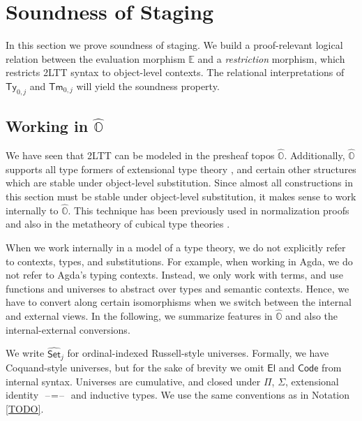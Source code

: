 \documentclass[acmsmall]{acmart}
\newcommand{\msf}[1]{\mathsf{#1}}
\newcommand{\mbb}[1]{\mathbb{#1}}
\newcommand{\wh}[1]{\widehat{#1}}
\newcommand{\Code}{\msf{Code}}
\newcommand{\El}{\msf{El}}
\newcommand{\mbbo}{\mbb{O}}
\newcommand{\Ty}{\msf{Ty}}
\newcommand{\Tm}{\msf{Tm}}
\newcommand{\Set}{\mathsf{Set}}
\newcommand{\blank}{{\mathord{\hspace{1pt}\text{--}\hspace{1pt}}}}
\newcommand{\hato}{\bm\hat{\mbbo}}
\newcommand{\ev}{\mbb{E}}
\theoremstyle{remark}
\newcommand{\whset}{\wh{\Set}}
\begin{document}
\section{Soundness of Staging}

In this section we prove soundness of staging. We build a proof-relevant logical
relation between the evaluation morphism $\ev$ and a \emph{restriction}
morphism, which restricts 2LTT syntax to object-level contexts. The relational
interpretations of $\Ty_{0,j}$ and $\Tm_{0,j}$ will yield the soundness
property.

\subsection{Working in $\hat{\mbbo}$}

We have seen that 2LTT can be modeled in the presheaf topos
$\hato$. Additionally, $\hato$ supports all type formers of extensional type
theory \cite{TODO}, and certain other structures which are stable under
object-level substitution. Since almost all constructions in this section must
be stable under object-level substitution, it makes sense to work internally to
$\hato$. This technique has been previously used in normalization proofs
\cite{TODO} and also in the metatheory of cubical type theories \cite{TODO}.

When we work internally in a model of a type theory, we do not explicitly refer
to contexts, types, and substitutions. For example, when working in Agda, we do
not refer to Agda's typing contexts. Instead, we only work with terms, and use
functions and universes to abstract over types and semantic contexts. Hence, we
have to convert along certain isomorphisms when we switch between the internal
and external views. In the following, we summarize features in $\hato$ and also
the internal-external conversions.

We write $\whset_j$ for ordinal-indexed Russell-style universes. Formally, we
have Coquand-style universes, but for the sake of brevity we omit $\El$ and
$\Code$ from internal syntax. Universes are cumulative, and closed under $\Pi$,
$\Sigma$, extensional identity $\blank\!=\!\blank$ and inductive types. We use
the same conventions as in Notation \ref{TODO}.
\end{document}
